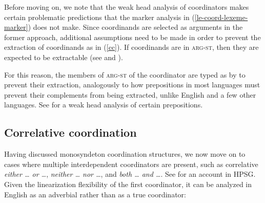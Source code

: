 Before moving on, we note that the weak head analysis of coordinators makes certain problematic predictions that the marker analysis in (\ref{le-coord-lexeme-marker}) does not make. Since coordinands are selected as arguments in the former approach,  additional assumptions need to be made in
 order to prevent the  extraction of coordinands as in (\ref{cc}).
If coordinands are in \textsc{arg-st}, then they are expected to be extractable
(see  and \crossrefchapteralt[\page \pageref{page-hpsg-traceless-account-arg-st-extraction-conjuncts}]{islands}).


\z




\noindent
For this reason, the members of \textsc{arg-st} of the coordinator are typed as  by \citet[]{Abeille:03} to prevent their extraction, analogously to how prepositions in most languages must prevent their complements from being extracted, unlike English and a few other languages.
See \citet[Section~3.2]{Abeille06} for a weak head analysis of certain  prepositions.




\subsection{Correlative coordination}\label{correlphr}

Having discussed monosyndeton coordination structures, we now move on to cases where
multiple interdependent coordinators are present, such as correlative \emph{either \ldots{} or \ldots{}},
\emph{neither \ldots{} nor \ldots{}}, 
and \emph{both \ldots{} and \ldots{}}. See \citet{hof} for an account  in HPSG. Given the linearization flexibility of the first coordinator, it can be analyzed in English as an adverbial rather than as a true coordinator:

